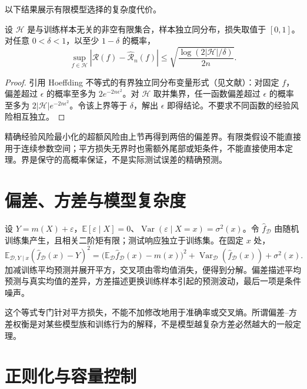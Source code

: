 以下结果展示有限模型选择的复杂度代价。
\begin{theorem}[有限类的一致偏差界]
设 $\mathcal H$ 是与训练样本无关的非空有限集合，样本独立同分布，损失取值于 $[0,1]$。对任意 $0<\delta<1$，以至少 $1-\delta$ 的概率，
\begin{equation}
 \sup_{f\in\mathcal H}|\mathcal R(f)-\widehat{\mathcal R}_n(f)|
 \leq\sqrt{\frac{\log(2|\mathcal H|/\delta)}{2n}}.
 \label{eq:ml-finite-bound}
\end{equation}
\end{theorem}
\begin{proof}
引用 Hoeffding 不等式的有界独立同分布变量形式（见文献\cite[附录B.4]{ml-uml}）：对固定 $f$，偏差超过 $\epsilon$ 的概率至多为 $2e^{-2n\epsilon^2}$。对 $\mathcal H$ 取并集界，任一函数偏差超过 $\epsilon$ 的概率至多为 $2|\mathcal H|e^{-2n\epsilon^2}$。令该上界等于 $\delta$，解出 $\epsilon$ 即得结论。不要求不同函数的经验风险相互独立。
\end{proof}

精确经验风险最小化的超额风险由上节再得到两倍的偏差界。有限类假设不能直接用于连续参数空间；平方损失无界时也需额外尾部或矩条件，不能直接使用本定理。界是保守的高概率保证，不是实际测试误差的精确预测。

\section{偏差、方差与模型复杂度}

设 $Y=m(X)+\varepsilon$，$\mathbb E[\varepsilon\mid X]=0$、$\operatorname{Var}(\varepsilon\mid X=x)=\sigma^2(x)$。令 $\widehat f_{\mathcal D}$ 由随机训练集产生，且相关二阶矩有限；测试响应独立于训练集。在固定 $x$ 处，
\begin{equation}
 \mathbb E_{\mathcal D,Y\mid x}(\widehat f_{\mathcal D}(x)-Y)^2
 =\bigl(\mathbb E_{\mathcal D}\widehat f_{\mathcal D}(x)-m(x)\bigr)^2
 +\operatorname{Var}_{\mathcal D}(\widehat f_{\mathcal D}(x))
 +\sigma^2(x).
 \label{eq:ml-bias-variance}
\end{equation}
加减训练平均预测并展开平方，交叉项由零均值消失，便得到分解。偏差描述平均预测与真实均值的差异，方差描述更换训练样本引起的预测波动，最后一项是条件噪声。

这个等式专门针对平方损失，不能不加修改地用于准确率或交叉熵。所谓偏差--方差权衡是对某些模型族和训练行为的解释，不是模型越复杂方差必然越大的一般定理。

\section{正则化与容量控制}


